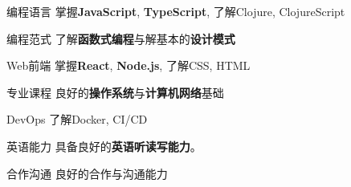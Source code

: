 

\begin{cvskills}

\cvskill
  {编程语言} %
  {掌握\textbf{JavaScript}, \textbf{TypeScript}, 了解Clojure, ClojureScript} %

\cvskill
{编程范式} %
{了解\textbf{函数式编程}与解基本的\textbf{设计模式}} %

\cvskill
  {Web前端} %
  {掌握\textbf{React}, \textbf{Node.js}, 了解CSS, HTML} %

\cvskill
  {专业课程} %
  {良好的\textbf{操作系统}与\textbf{计算机网络}基础} %
  
\cvskill
    {DevOps} %
    {了解Docker, CI/CD} %

\cvskill
  {英语能力} %
  {具备良好的\textbf{英语听读写能力}。} %

\cvskill
  {合作沟通} %
  {良好的合作与沟通能力} %

\end{cvskills}
